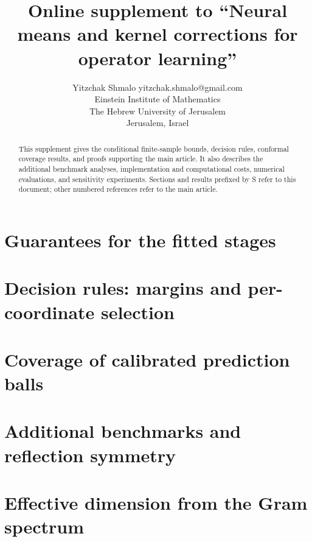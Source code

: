 \documentclass[twoside,11pt]{article}
\numberwithin{theorem}{section}
\numberwithin{equation}{section}
\numberwithin{figure}{section}
\numberwithin{table}{section}
\begin{document}
\title{Online supplement to ``Neural means and kernel corrections for
operator learning''}

\author{\name Yitzchak Shmalo \email yitzchak.shmalo@gmail.com \\
       \addr Einstein Institute of Mathematics\\
       The Hebrew University of Jerusalem\\
       Jerusalem, Israel}

\maketitle

\begin{abstract}%
This supplement gives the conditional finite-sample bounds, decision rules,
conformal coverage results, and proofs supporting the main article. It also
describes the additional benchmark analyses, implementation and computational
costs, numerical evaluations, and sensitivity experiments. Sections and results
prefixed by S refer to this document; other numbered references refer to
the main article.
\end{abstract}

\section{Guarantees for the fitted stages}
\label{supp:stages}


\section{Decision rules: margins and per-coordinate selection}
\label{supp:rules}


\section{Coverage of calibrated prediction balls}
\label{supp:conf}


\section{Additional benchmarks and reflection symmetry}
\label{supp:benchmark}


\section{Effective dimension from the Gram spectrum}
\label{supp:deff}

\end{document}
